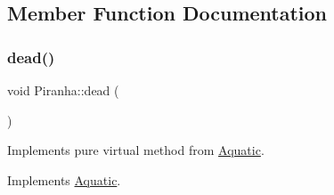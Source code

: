 \subsection{Member Function Documentation}
\mbox{\label{class_piranha_a1f30b46fb909558c44eba327e99d5f2e}} 
\subsubsection{\texorpdfstring{dead()}{dead()}}
{\footnotesize\ttfamily void Piranha\+::dead (\begin{DoxyParamCaption}{ }\end{DoxyParamCaption})\hspace{0.3cm}{\ttfamily [virtual]}}



Implements pure virtual method from \mbox{\hyperlink{class_aquatic}{Aquatic}}. 



Implements \mbox{\hyperlink{class_aquatic_a22fdb11e9cfec922fe50638709768276}{Aquatic}}.

